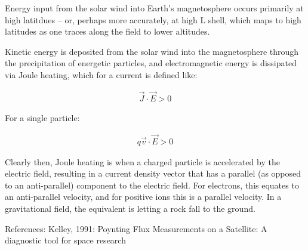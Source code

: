 
Energy input from the solar wind into Earth's magnetosphere occurs
primarily at high latitdues -- or, perhaps more accurately, at high L
shell, which maps to high latitudes as one traces along the field to
lower altitudes.

Kinetic energy is deposited from the solar wind into the magnetosphere
through the precipitation of energetic particles, and electromagnetic
energy is dissipated via Joule heating, which for a current is defined
like:

\begin{gather}
  \vec{J}\cdot\vec{E} > 0
\end{gather}

For a single particle:

\begin{gather}
  q\vec{v}\cdot\vec{E} > 0
\end{gather}

Clearly then, Joule heating is when a charged particle is accelerated by the
electric field, resulting in a current density vector that has a parallel (as
opposed to an anti-parallel) component to the electric field. For
electrons, this equates to an anti-parallel velocity, and for positive
ions this is a parallel velocity.
In a gravitational field, the equivalent is letting a rock fall to the ground.




References:
Kelley, 1991: Poynting Flux Measurements on a Satellite: A diagnostic
tool for space research
